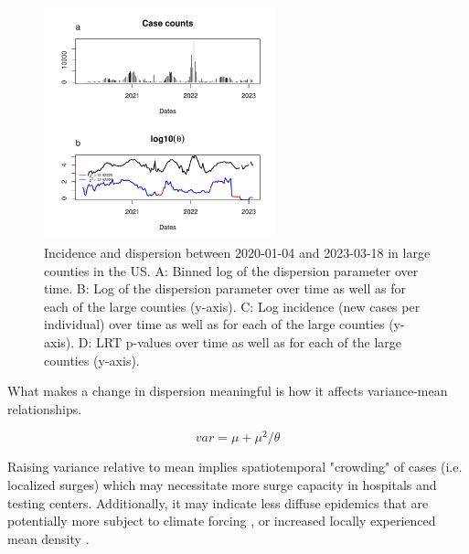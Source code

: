 \documentclass[10pt,letterpaper]{article}
\begin{document}
\begin{figure}[!h]
\includegraphics[width=0.6\textwidth]{fig2}
\caption{
Incidence and dispersion between 2020-01-04 and 2023-03-18 in large counties in the US. A: Binned log of the dispersion parameter over time. B: Log of the dispersion parameter over time as well as for each of the large counties (y-axis). C: Log incidence (new cases per individual) over time as well as for each of the large counties (y-axis). D: LRT p-values over time as well as for each of the large counties (y-axis).
}
\label{fig2}
\end{figure}

What makes a change in dispersion meaningful is how it affects variance-mean relationships. 

\begin{equation}
var = \mu + \mu^2/\theta  
\end{equation}

Raising variance relative to mean implies spatiotemporal "crowding" of cases (i.e. localized surges) which may necessitate more surge capacity in hospitals and testing centers. 
Additionally, it may indicate less diffuse epidemics that are potentially more subject to climate forcing \cite{dalziel_urbanization_2018}, or increased locally experienced mean density \cite{lloyd_mean_1967}. 
\end{document}
